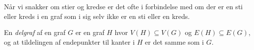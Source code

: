 Når vi snakker om stier og kredse er det ofte i forbindelse med om der er en sti eller kreds i en graf som i sig selv ikke er en sti eller en kreds.

\begin{definition}[Delgraf]
En \textit{delgraf} af en graf $G$ er en graf $H$ hvor $V(H) \subseteq V(G)$ og $E(H) \subseteq E(G)$, og at tildelingen af endepunkter til kanter i $H$ er det samme som i $G$.
\end{definition}


